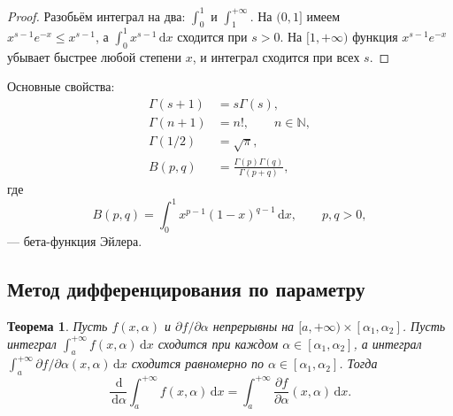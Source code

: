 \documentclass[coursework, och, times]{SCWorks1}
\newtheorem{theorem}{Теорема}
\newcommand{\N}{\mathbb{N}}
\newcommand{\dd}{\,\mathrm{d}}
\renewcommand{\le}{\leqslant}
\begin{document}
\begin{proof}
Разобьём интеграл на два: $\int_0^1$ и $\int_1^{+\infty}$. На $(0,1]$ имеем\\ $x^{s-1}e^{-x}\le x^{s-1}$, а $\int_0^1 x^{s-1}\dd x$ сходится при $s>0$. На $[1,+\infty)$ функция $x^{s-1}e^{-x}$ убывает быстрее любой степени $x$, и интеграл сходится при всех $s$.
\end{proof}

Основные свойства:
\begin{align*}
\Gamma(s+1)&=s\Gamma(s),\\
\Gamma(n+1)&=n!,\qquad n\in\N,\\
\Gamma(1/2)&=\sqrt{\pi},\\
B(p,q)&=\frac{\Gamma(p)\Gamma(q)}{\Gamma(p+q)},
\end{align*}
где
\[
B(p,q)=\int_0^1 x^{p-1}(1-x)^{q-1}\dd x,\qquad p,q>0,
\]
— бета-функция Эйлера.

\subsection{Метод дифференцирования по параметру}

\begin{theorem}\label{th:param}
Пусть $f(x,\alpha)$ и $\partial f/\partial\alpha$ непрерывны на $[a,+\infty)\times[\alpha_1,\alpha_2]$. Пусть интеграл $\int_a^{+\infty}f(x,\alpha)\dd x$ сходится при каждом $\alpha\in[\alpha_1,\alpha_2]$, а интеграл $\int_a^{+\infty}\partial f/\partial\alpha(x,\alpha)\dd x$ сходится равномерно по $\alpha\in[\alpha_1,\alpha_2]$. Тогда
\[
\frac{\dd}{\dd\alpha}\int_a^{+\infty}f(x,\alpha)\dd x = \int_a^{+\infty}\frac{\partial f}{\partial\alpha}(x,\alpha)\dd x.
\]
\end{theorem}
\end{document}
